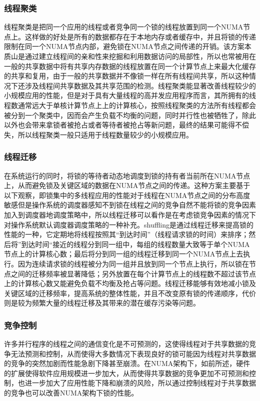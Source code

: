 \subsubsection{线程聚类}
线程聚类是把同一个应用的线程或者竞争同一个锁的线程放置到同一个NUMA节点上\cite{tam2007thread}\cite{thekkath1994impact}\cite{xian2008contention}。这样做的好处是所有的数据都存在于本地内存或者缓存中，并且将锁的传递限制在同一个NUMA节点内部，避免锁在NUMA节点之间传递的开销。该方案本质山是通过建立线程间的亲和性来挖掘和利用数据访问的局部性，所以也常被用在一般的共享数据中将有共享内存数据的线程放置在同一个计算节点上来最大化缓存的共享和复用，由于一般的共享数据并不像锁一样在所有线程间共享，所以这种情况下还涉及线程间共享数据及其共享范围的检测。线程聚类能显著改善线程较少的小规模应用的性能，但是对于具有大量线程的高并发应用程序而言，其所拥有的线程数通常远大于单核计算节点上上的计算核心，按照线程聚类的方法所有线程都会被分到一个聚类中，因而会产生负载不均衡的问题，同时并行性也被牺牲了，除此以外也会带来拿锁者被抢占或者等待者被抢占等新问题，最终的结果可能得不偿失，所以线程聚类一般只适用于线程数量较少的小规模应用。
\subsubsection{线程迁移}
在系统运行的同时，将锁的等待者动态地调度到锁的持有者当前所在NUMA节点上，从而避免锁及关键区域的数据在NUMA节点之间的传递\cite{sridharan2006thread}\cite{thekkath1994impact}。这种方案主要基于以下观察，即锁集中的多线程应用的性能对于线程在NUMA节点之间的分布高度敏感但是操作系统的调度器感知不到锁在线程之间的竞争自然不能将锁的竞争因素加入到调度器地调度策略中，所以线程迁移可以看作是在考虑锁竞争因素的情况下对操作系统默认调度器调度策略的一种补充。shuffling\cite{pusukuri2014shuffling}是通过线程迁移来提高锁的性能的一种，它定期地将线程按照其“到达时间”（线程请求锁的时间）来排序；然后将”到达时间“接近的线程分到同一组中，每组的线程数量大致等于单个NUMA节点上的计算核心数；最后将分到同一组的线程迁移到同一个NUMA节点上去执行。因为连续请求锁的线程被分为同一组并且放到同一个节点上执行，所以锁在节点之间的迁移频率被显著降低；另外放置在每个计算节点上的线程数不超过该节点上的计算核心数又能避免负载不均衡及抢占等问题。线程迁移能够有效地减小锁及关键区域的迁移频率，提高系统的整体性能，并且不改变原有锁的传递顺序，代价则是较为频繁大量的线程迁移及其带来的潜在缓存污染等问题。
\subsubsection{竞争控制}
许多并行程序的线程之间的通信变化是不可预测的，这使得线程对于共享数据的竞争无法预测和控制，从而使得大多数情况下表现良好的锁可能因为线程对共享数据的竞争的突然加剧而性能急剧下降甚至崩溃\cite{johnson2010decoupling}\cite{boyd2012non}。在NUMA架构下，如前所述，硬件的扩展使得软件应用规模进一步加大，从而使得共享数据的竞争更加不可预测和控制，也进一步加大了应用性能下降和崩溃的风险，所以通过控制线程对于共享数据的竞争也可以改善NUMA架构下锁的性能。

